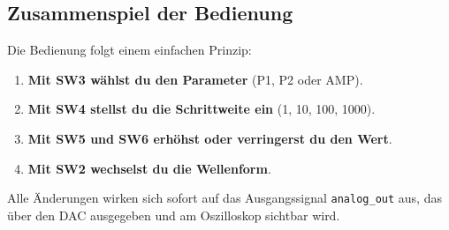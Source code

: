 \subsection*{Zusammenspiel der Bedienung}

Die Bedienung folgt einem einfachen Prinzip:
\begin{enumerate}
    \item \textbf{Mit SW3 wählst du den Parameter} (P1, P2 oder AMP).
    \item \textbf{Mit SW4 stellst du die Schrittweite ein} (1, 10, 100, 1000).
    \item \textbf{Mit SW5 und SW6 erhöhst oder verringerst du den Wert}.
    \item \textbf{Mit SW2 wechselst du die Wellenform}.
\end{enumerate}

Alle Änderungen wirken sich sofort auf das Ausgangssignal \texttt{analog\_out}
aus, das über den DAC ausgegeben und am Oszilloskop sichtbar wird.

